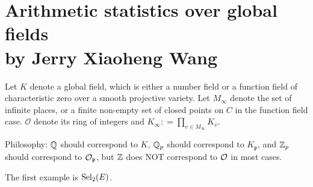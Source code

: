 \documentclass[12pt,amsfont]{amsart}
\begin{document}
\newpage
\renewcommand{\thesubsection}{\arabic{section}.\arabic{subsection}}

\section{Arithmetic statistics over global fields\\
by Jerry Xiaoheng Wang}\label{8}

Let $K$ denote a global field, which is either a number field or a function field of characteristic zero over a smooth projective variety. Let $M_\infty$ denote the set of infinite places, or a finite non-empty set of closed points on $C$ in the function field case. $\mathcal{O}$ denote its ring of integers and $K_\infty : =\prod_{v \in M_\infty} K_v$. 
\begin{rmk}
Philosophy: ${\mathbb Q}$ should correspond to $K$, ${\mathbb Q}_p$ should correspond to $K_{\mathfrak{p}}$, and ${\mathbb Z}_p$ should correspond to $\mathcal{O}_{\mathfrak{p}}$, but ${\mathbb Z}$ does NOT correspond to $\mathcal{O}$ in most cases. 
\end{rmk}
The first example is $\operatorname{Sel}_2(E)$.
\end{document}
